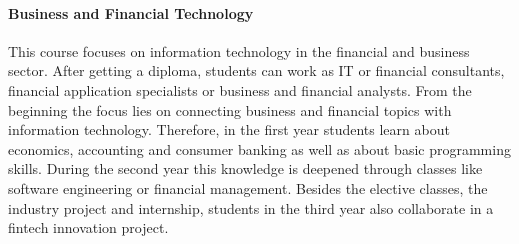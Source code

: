 \paragraph{Business and Financial Technology}
This course focuses on information technology in the financial and business sector. After getting a diploma, students can work as IT or financial consultants, financial application specialists or business and financial analysts. From the beginning the focus lies on connecting business and financial topics with information technology. Therefore, in the first year students learn about economics, accounting and consumer banking as well as about basic programming skills. During the second year this knowledge is deepened through classes like software engineering or financial management. Besides the elective classes, the industry project and internship, students in the third year also collaborate in a fintech innovation project.


